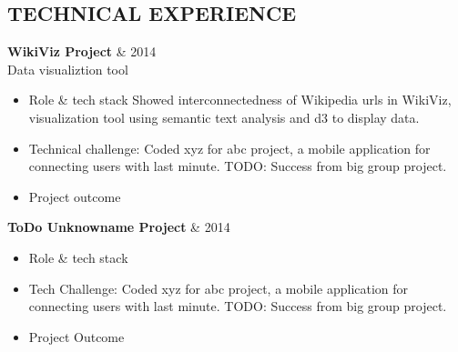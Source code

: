 \documentclass[11pt]{res} %
\begin{document}
\begin{resume}
%


\section{TECHNICAL EXPERIENCE} 
\vspace{4pt}

{\bf WikiViz Project} \& 2014 \\
Data visualiztion tool \\
\begin{itemize} \itemsep -1pt 
  \item Role \& tech stack
  Showed interconnectedness of Wikipedia urls in WikiViz, visualization tool using semantic text analysis and d3 to display data.
  \item Technical challenge: Coded xyz for abc project, a mobile application for connecting users with last minute. TODO: Success from big group project.
  \item Project outcome
\end{itemize}

{\bf ToDo Unknowname Project}  \& 2014 \\
\begin{itemize} \itemsep -1pt 
  \item Role \& tech stack
  \item Tech Challenge: Coded xyz for abc project, a mobile application for connecting users with last minute. TODO: Success from big group project.
  \item Project Outcome
\end{itemize}



\end{resume}
\end{document}
